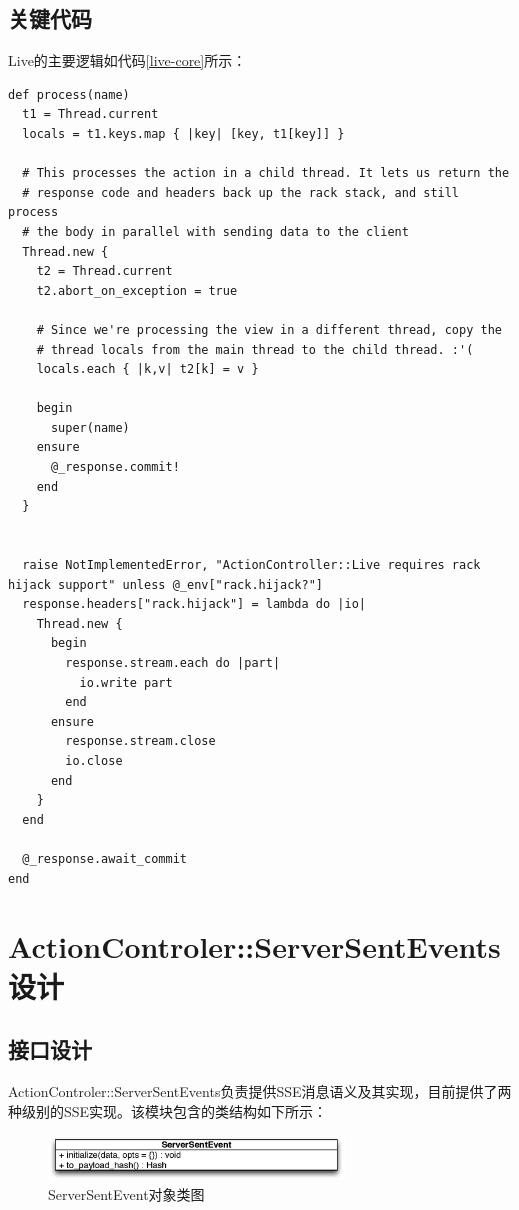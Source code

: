 \subsection{关键代码}
Live的主要逻辑如代码\ref{live-core}所示：
\begin{lstlisting}[caption={Live核心代码展示}, label=live-core]
def process(name)
  t1 = Thread.current
  locals = t1.keys.map { |key| [key, t1[key]] }

  # This processes the action in a child thread. It lets us return the
  # response code and headers back up the rack stack, and still process
  # the body in parallel with sending data to the client
  Thread.new {
    t2 = Thread.current
    t2.abort_on_exception = true

    # Since we're processing the view in a different thread, copy the
    # thread locals from the main thread to the child thread. :'(
    locals.each { |k,v| t2[k] = v }

    begin
      super(name)
    ensure
      @_response.commit!
    end
  }


  raise NotImplementedError, "ActionController::Live requires rack hijack support" unless @_env["rack.hijack?"]
  response.headers["rack.hijack"] = lambda do |io|
    Thread.new {
      begin
        response.stream.each do |part|
          io.write part
        end
      ensure
        response.stream.close
        io.close
      end
    }
  end

  @_response.await_commit
end
\end{lstlisting}

\section{ActionControler::ServerSentEvents设计}
\subsection{接口设计}
ActionControler::ServerSentEvents负责提供SSE消息语义及其实现，目前提供了两种级别的SSE实现。该模块包含的类结构如下所示：

\begin{figure}[h]
\centering
\includegraphics[width=0.7\textwidth]{images/detail/sse_class.eps}
\caption{ServerSentEvent对象类图}
\label{fig-sse-class}
\end{figure}

